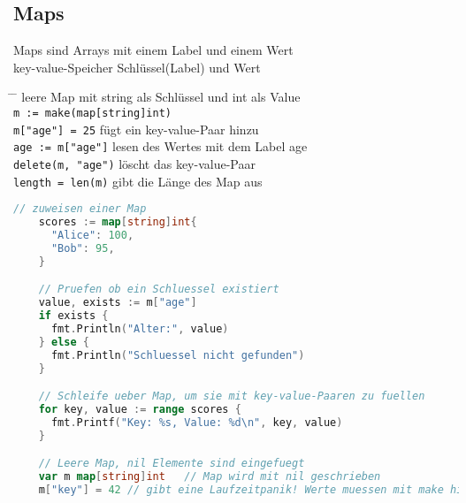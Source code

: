 \documentclass[twoside,a4paper,12pt]{article}
\begin{document}
\subsection{Maps}
Maps sind Arrays mit einem Label und einem Wert \\
key-value-Speicher Schlüssel(Label) und Wert 
\begin{tabbing}
 \hspace{2mm} \= \hspace{50mm} \= \kill
  \> leere Map mit string als Schlüssel und int als Value \\ 
 \> \verb|m := make(map[string]int)| \\ 
 \> \verb|m["age"] = 25| \> fügt ein key-value-Paar hinzu \\ 
 \> \verb|age := m["age"]| \> lesen des Wertes mit dem Label age \\ 
 \> \verb|delete(m, "age")| \> löscht das key-value-Paar \\ 
 \> \verb|length = len(m)| \> gibt die Länge des Map aus \\ 
\end{tabbing}
\begin{center}
  \begin{minipage}{1.0\textwidth}
    \begin{lstlisting}[language=Go]
    // zuweisen einer Map
    scores := map[string]int{ 
      "Alice": 100,
      "Bob": 95,
    }

    // Pruefen ob ein Schluessel existiert
    value, exists := m["age"]
    if exists {
      fmt.Println("Alter:", value)
    } else {
      fmt.Println("Schluessel nicht gefunden")
    }

    // Schleife ueber Map, um sie mit key-value-Paaren zu fuellen
    for key, value := range scores {
      fmt.Printf("Key: %s, Value: %d\n", key, value)
    }

    // Leere Map, nil Elemente sind eingefuegt
    var m map[string]int   // Map wird mit nil geschrieben 
    m["key"] = 42 // gibt eine Laufzeitpanik! Werte muessen mit make hinzugefuegt werden 
    \end{lstlisting}
  \end{minipage}
\end{center}
\end{document}
